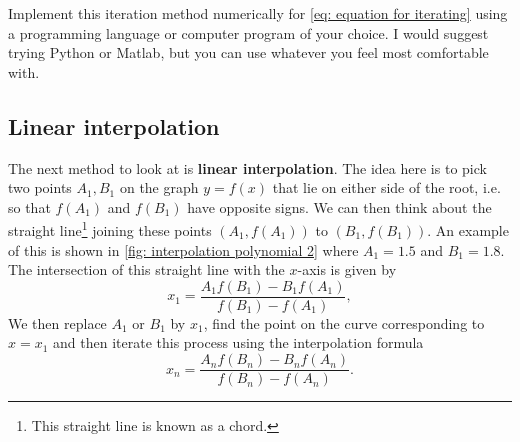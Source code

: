 \begin{exercise}
Implement this iteration method numerically  for \cref{eq: equation for iterating} using a programming language or computer program of your choice. I would suggest trying Python or Matlab, but you can use whatever you feel most comfortable with.
\end{exercise}

\subsection*{Linear interpolation}
The next method to look at is \textbf{linear interpolation}.  The idea here is to pick two points $A_{1},B_{1}$ on the graph $y=f(x)$ that lie on either side of the root, i.e. so that $f(A_{1})$ and $f(B_{1})$ have opposite signs. We can then think about the straight line\footnote{This straight line is known as a chord.} joining these points $(A_{1},f(A_{1}))$ to $(B_{1},f(B_{1}))$. An example of this is shown in \cref{fig: interpolation polynomial 2} where $A_{1}=1.5$ and $B_{1}=1.8$.\\

The intersection of this straight line with the $x$-axis is given by
\begin{equation*}
x_{1}=\frac{A_{1}f(B_{1})-B_{1}f(A_{1})}{f(B_{1})-f(A_{1})},
\end{equation*}
We then replace $A_{1}$ or $B_{1}$ by $x_{1}$, find the point on the curve corresponding to $x=x_{1}$ and then iterate this process using the interpolation formula
\begin{equation}
x_{n}=\frac{A_{n}f(B_{n})-B_{n}f(A_{n})}{f(B_{n})-f(A_{n})}.
\label{eq: linear interpolation formula}
\end{equation}


